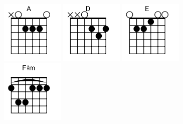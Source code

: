 \begin{figure}[h]
\predtitle\centering
\includegraphics[width=3cm]{../Akordy/a.png}
\includegraphics[width=3cm]{../Akordy/d.png}
\includegraphics[width=3cm]{../Akordy/e.png}
\includegraphics[width=3cm]{../Akordy/fxm.png}
\end{figure}
